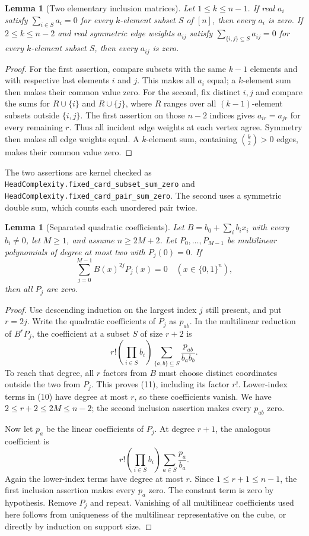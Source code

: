 \documentclass[11pt]{article}
\newtheorem{lemma}[theorem]{Lemma}
\begin{document}
\begin{lemma}[Two elementary inclusion matrices]
Let $1\le k\le n-1$. If real $a_i$ satisfy
$\sum_{i\in S}a_i=0$ for every $k$-element subset $S$ of $[n]$,
then every $a_i$ is zero. If $2\le k\le n-2$ and real symmetric
edge weights $a_{ij}$ satisfy
$\sum_{\{i,j\}\subseteq S}a_{ij}=0$ for every $k$-element
subset $S$, then every $a_{ij}$ is zero.
\end{lemma}
\begin{proof}
For the first assertion, compare subsets with the same $k-1$
elements and with respective last elements $i$ and $j$. This makes
all $a_i$ equal; a $k$-element sum then makes their common value
zero. For the second, fix distinct $i,j$ and compare the sums for
$R\cup\{i\}$ and $R\cup\{j\}$, where $R$ ranges over all
$(k-1)$-element subsets outside $\{i,j\}$. The first assertion
on those $n-2$ indices gives $a_{ir}=a_{jr}$ for every remaining
$r$. Thus all incident edge weights at each vertex agree. Symmetry
then makes all edge weights equal. A $k$-element sum, containing
$\binom{k}{2}>0$ edges, makes their common value zero.
\end{proof}

The two assertions are kernel checked as
\texttt{HeadComplexity.fixed\_card\_subset\_sum\_zero} and
\texttt{HeadComplexity.fixed\_card\_pair\_sum\_zero}. The second
uses a symmetric double sum, which counts each unordered pair twice.

\begin{lemma}[Separated quadratic coefficients]
Let $B=b_0+\sum_i b_ix_i$ with every $b_i\ne0$, let $M\ge1$,
and assume $n\ge2M+2$. Let $P_0,\ldots,P_{M-1}$ be multilinear
polynomials of degree at most two with $P_j(0)=0$. If
\[
                \sum_{j=0}^{M-1} B(x)^{2j}P_j(x)=0
                       \quad(x\in\{0,1\}^n),
 \tag{10}
\]
then all $P_j$ are zero.
\end{lemma}
\begin{proof}
Use descending induction on the largest index $j$ still present,
and put $r=2j$. Write the quadratic coefficients of $P_j$ as
$p_{ab}$. In the multilinear reduction of $B^rP_j$, the
coefficient at a subset $S$ of size $r+2$ is
\[
 r!\left(\prod_{i\in S}b_i\right)
       \sum_{\{a,b\}\subseteq S}\frac{p_{ab}}{b_ab_b}.
 \tag{11}
\]
To reach that degree, all $r$ factors from $B$ must choose
distinct coordinates outside the two from $P_j$. This proves
(11), including its factor $r!$. Lower-index terms in (10)
have degree at most $r$, so these coefficients vanish. We have
$2\le r+2\le2M\le n-2$; the second inclusion assertion makes
every $p_{ab}$ zero.

Now let $p_a$ be the linear coefficients of $P_j$. At degree
$r+1$, the analogous coefficient is
\[
 r!\left(\prod_{i\in S}b_i\right)
                          \sum_{a\in S}\frac{p_a}{b_a}.
 \tag{12}
\]
Again the lower-index terms have degree at most $r$. Since
$1\le r+1\le n-1$, the first inclusion assertion makes every
$p_a$ zero. The constant term is zero by hypothesis. Remove
$P_j$ and repeat. Vanishing of all multilinear coefficients used
here follows from uniqueness of the multilinear representative
on the cube, or directly by induction on support size.
\end{proof}
\end{document}
